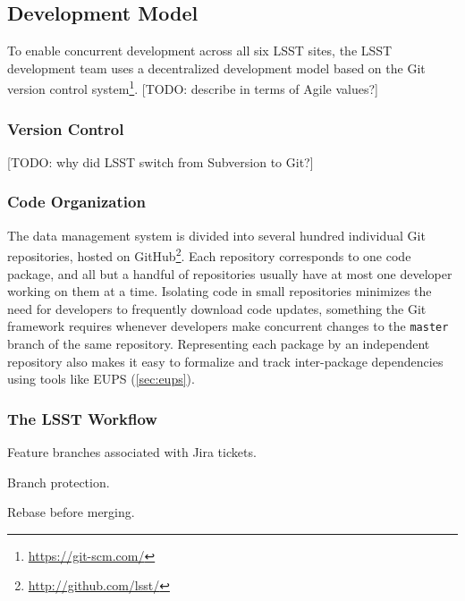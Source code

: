 \subsection{Development Model}\label{sec:development}

To enable concurrent development across all six LSST sites, the LSST development team uses a decentralized development model based on the Git version control system\footnote{\url{https://git-scm.com/}}.
[TODO: describe in terms of Agile values?]

\subsubsection{Version Control}\label{sec:git}\label{sec:subversion}

[TODO: why did LSST switch from Subversion to Git?]

\subsubsection{Code Organization}\label{sec:git_repositories}

The data management system is divided into several hundred individual Git repositories, hosted on GitHub\footnote{\url{http://github.com/lsst/}}.
Each repository corresponds to one code package, and all but a handful of repositories usually have at most one developer working on them at a time.
Isolating code in small repositories minimizes the need for developers to frequently download code updates, something the Git framework requires whenever developers make concurrent changes to the \texttt{master} branch of the same repository.
Representing each package by an independent repository also makes it easy to formalize and track inter-package dependencies using tools like EUPS (\autoref{sec:eups}).

\subsubsection{The LSST Workflow}\label{sec:dev_workflow}

Feature branches associated with Jira tickets.

Branch protection.

Rebase before merging.


